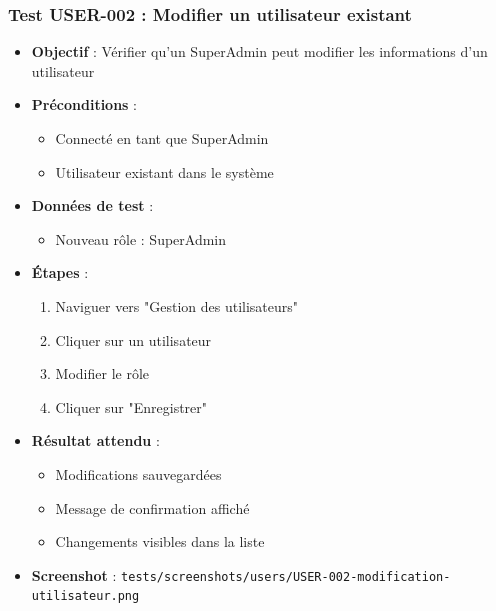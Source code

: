 \subsubsection{Test USER-002 : Modifier un utilisateur existant}
\begin{itemize}
    \item \textbf{Objectif} : Vérifier qu'un SuperAdmin peut modifier les informations d'un utilisateur
    \item \textbf{Préconditions} : 
        \begin{itemize}
            \item Connecté en tant que SuperAdmin
            \item Utilisateur existant dans le système
        \end{itemize}
    \item \textbf{Données de test} :
        \begin{itemize}
            \item Nouveau rôle : SuperAdmin
        \end{itemize}
    \item \textbf{Étapes} :
        \begin{enumerate}
            \item Naviguer vers "Gestion des utilisateurs"
            \item Cliquer sur un utilisateur
            \item Modifier le rôle
            \item Cliquer sur "Enregistrer"
        \end{enumerate}
    \item \textbf{Résultat attendu} : 
        \begin{itemize}
            \item Modifications sauvegardées
            \item Message de confirmation affiché
            \item Changements visibles dans la liste
        \end{itemize}
    \item \textbf{Screenshot} : \texttt{tests/screenshots/users/USER-002-modification-utilisateur.png}
\end{itemize}

